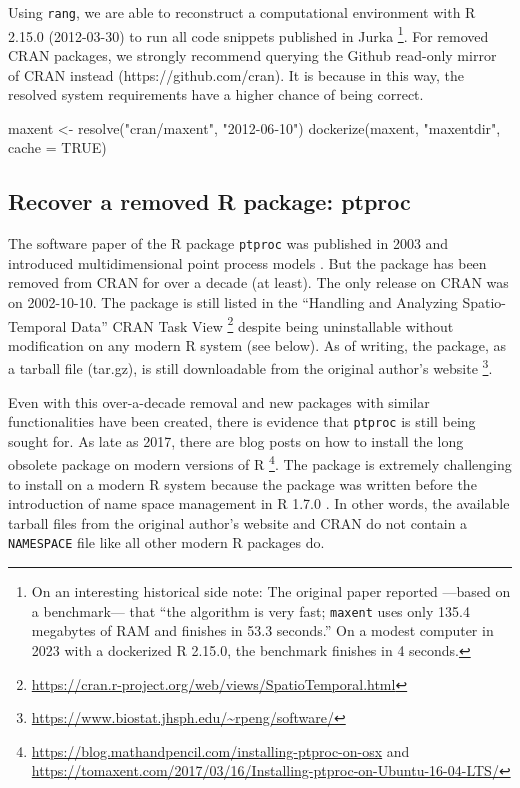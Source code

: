 \documentclass[
  10pt,
  letterpaper,
]{article}
\newenvironment{Shaded}{\begin{snugshade}}{\end{snugshade}}
\newcommand{\AttributeTok}[1]{\textcolor[rgb]{0.40,0.45,0.13}{#1}}
\newcommand{\ConstantTok}[1]{\textcolor[rgb]{0.56,0.35,0.01}{#1}}
\newcommand{\FunctionTok}[1]{\textcolor[rgb]{0.28,0.35,0.67}{#1}}
\newcommand{\NormalTok}[1]{\textcolor[rgb]{0.00,0.23,0.31}{#1}}
\newcommand{\OtherTok}[1]{\textcolor[rgb]{0.00,0.23,0.31}{#1}}
\newcommand{\StringTok}[1]{\textcolor[rgb]{0.13,0.47,0.30}{#1}}
\begin{document}
Using \texttt{rang}, we are able to reconstruct a computational
environment with R 2.15.0 (2012-03-30) to run all code snippets
published in Jurka \citep{jurka:2012} \footnote{On an interesting
  historical side note: The original paper reported ---based on a
  benchmark--- that ``the algorithm is very fast; \texttt{maxent} uses
  only 135.4 megabytes of RAM and finishes in 53.3 seconds.'' On a
  modest computer in 2023 with a dockerized R 2.15.0, the benchmark
  finishes in 4 seconds.}. For removed CRAN packages, we strongly
recommend querying the Github read-only mirror of CRAN instead
(https://github.com/cran). It is because in this way, the resolved
system requirements have a higher chance of being correct.

\begin{Shaded}
\begin{Highlighting}[]
\NormalTok{maxent }\OtherTok{\textless{}{-}} \FunctionTok{resolve}\NormalTok{(}\StringTok{"cran/maxent"}\NormalTok{, }\StringTok{"2012{-}06{-}10"}\NormalTok{)}
\FunctionTok{dockerize}\NormalTok{(maxent, }\StringTok{"maxentdir"}\NormalTok{, }\AttributeTok{cache =} \ConstantTok{TRUE}\NormalTok{)}
\end{Highlighting}
\end{Shaded}

\hypertarget{recover-a-removed-r-package-ptproc}{%
\subsection{Recover a removed R package:
ptproc}\label{recover-a-removed-r-package-ptproc}}

The software paper of the R package \texttt{ptproc} was published in
2003 and introduced multidimensional point process models
\citep{peng:2003:MDP}. But the package has been removed from CRAN for
over a decade (at least). The only release on CRAN was on 2002-10-10.
The package is still listed in the ``Handling and Analyzing
Spatio-Temporal Data'' CRAN Task View \footnote{\url{https://cran.r-project.org/web/views/SpatioTemporal.html}}
despite being uninstallable without modification on any modern R system
(see below). As of writing, the package, as a tarball file (tar.gz), is
still downloadable from the original author's website \footnote{\url{https://www.biostat.jhsph.edu/~rpeng/software/}}.

Even with this over-a-decade removal and new packages with similar
functionalities have been created, there is evidence that
\texttt{ptproc} is still being sought for. As late as 2017, there are
blog posts on how to install the long obsolete package on modern
versions of R \footnote{\url{https://blog.mathandpencil.com/installing-ptproc-on-osx}
  and
  \url{https://tomaxent.com/2017/03/16/Installing-ptproc-on-Ubuntu-16-04-LTS/}}.
The package is extremely challenging to install on a modern R system
because the package was written before the introduction of name space
management in R 1.7.0 \citep{RN-2003-001}. In other words, the available
tarball files from the original author's website and CRAN do not contain
a \texttt{NAMESPACE} file like all other modern R packages do.
\end{document}
